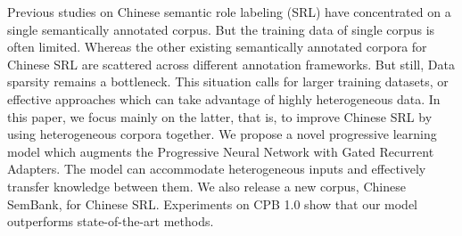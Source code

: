 Previous studies on Chinese semantic role labeling (SRL) have concentrated on a single semantically annotated corpus. But the training data of single corpus is often limited. Whereas the other existing semantically annotated corpora for Chinese SRL are scattered across different annotation frameworks. But still, Data sparsity remains a bottleneck. This situation calls for larger training datasets, or effective approaches which can take advantage of highly heterogeneous data. In this paper, we focus mainly on the latter, that is, to improve Chinese SRL by using heterogeneous corpora together. We propose a novel progressive learning model which augments the Progressive Neural Network with Gated Recurrent Adapters. The model can accommodate heterogeneous inputs and effectively transfer knowledge between them. We also release a new corpus, Chinese SemBank, for Chinese SRL. Experiments on CPB 1.0 show that our model outperforms state-of-the-art methods.
